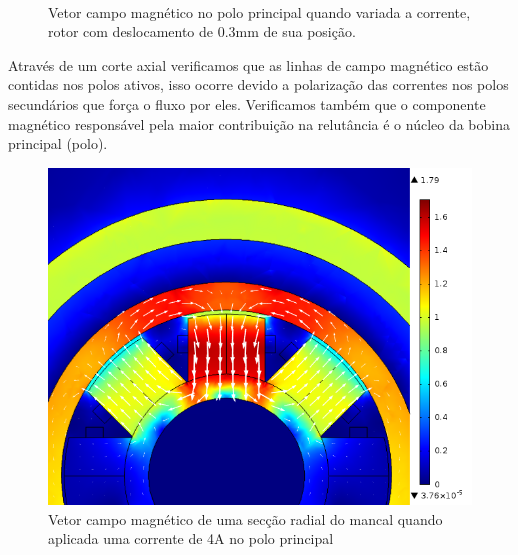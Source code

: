 \begin{figure}[!ht]
	\centering
		\\
	\caption{Vetor campo magnético no polo principal quando variada a corrente, rotor com deslocamento de 0.3mm de sua posição.}
	\label{fig:ativo:fem:b:polos}
\end{figure}

Através de um corte axial verificamos que as linhas de campo magnético estão contidas nos polos ativos, isso ocorre devido a polarização das correntes nos polos secundários que força o fluxo por eles. Verificamos também que o componente magnético responsável pela maior contribuição na relutância é o núcleo da bobina principal (polo).

\begin{figure}
\centering
\includegraphics[width=0.8\linewidth]{Figs/Simulacoes/Ativo/Cima_dx=03_I=4}
\caption{Vetor campo magnético de uma secção radial do mancal quando aplicada uma corrente de 4A no polo principal}
\label{fig:ativo:fem:b:radial}
\end{figure}



